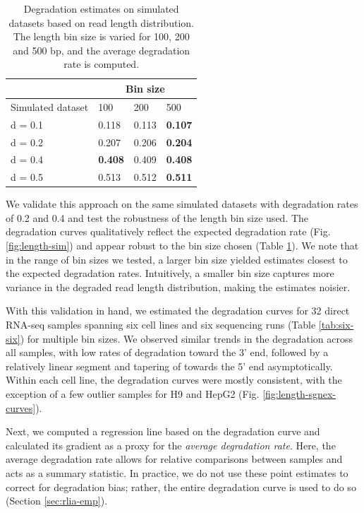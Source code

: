 \begin{table}[H]
  \centering
    \begin{tabular}{|p{3.5cm}|p{1.5cm}|p{1.5cm}|p{1.5cm}|}
\cline{2-4}    \multicolumn{1}{r|}{} & \multicolumn{3}{c|}{Bin size} \bigstrut\\
    \hline
    Simulated dataset & 100   & 200   & 500 \bigstrut\\
    \hline
    d = 0.1 & 0.118 & 0.113 & \textbf{0.107} \bigstrut\\
    \hline
    d = 0.2 & 0.207 & 0.206 & \textbf{0.204} \bigstrut\\
    \hline
    d = 0.4 & \textbf{0.408} & 0.409 & \textbf{0.408} \bigstrut\\
    \hline
    d = 0.5 & 0.513 & 0.512 & \textbf{0.511} \bigstrut\\
    \hline
    \end{tabular}%
  \caption[Degradation estimates on simulated datasets based on read length distribution]{Degradation estimates on simulated datasets based on read length distribution. The length bin size is varied for 100, 200 and 500 bp, and the average degradation rate is computed.}
  \label{tab:binsize}%
\end{table}%

We validate this approach on the same simulated datasets with degradation rates of 0.2 and 0.4 and test the robustness of the length bin size used. The degradation curves qualitatively reflect the expected degradation rate (Fig. \ref{fig:length-sim}) and appear robust to the bin size chosen (Table \ref{tab:binsize}). We note that in the range of bin sizes we tested, a larger bin size yielded estimates closest to the expected degradation rates. Intuitively, a smaller bin size captures more variance in the degraded read length distribution, making the estimates noisier.         

With this validation in hand, we estimated the degradation curves for 32 direct RNA-seq samples spanning six cell lines and six sequencing runs (Table \ref{tab:six-six}) for multiple bin sizes. We observed similar trends in the degradation across all samples, with low rates of degradation toward the 3' end, followed by a relatively linear segment and tapering of towards the 5' end asymptotically. Within each cell line, the degradation curves were mostly consistent, with the exception of a few outlier samples for H9 and HepG2 (Fig. \ref{fig:length-sgnex-curves}).  

Next, we computed a regression line based on the degradation curve and calculated its gradient as a proxy for the \textit{average degradation rate}. Here, the average degradation rate allows for relative comparisons between samples and acts as a summary statistic. In practice, we do not use these point estimates to correct for degradation bias; rather, the entire degradation curve is used to do so (Section \ref{sec:rlia-emp}).   

